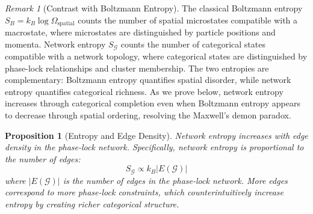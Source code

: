 \documentclass[12pt,a4paper]{article}
\newtheorem{proposition}[theorem]{Proposition}
\theoremstyle{definition}
\theoremstyle{remark}
\newtheorem{remark}[theorem]{Remark}
\newcommand{\phaselockgraph}{\mathcal{G}}
\begin{document}
\begin{remark}[Contrast with Boltzmann Entropy]
\label{rem:contrast_boltzmann}
The classical Boltzmann entropy $S_B = k_B \log \Omega_{\text{spatial}}$ counts the number of spatial microstates compatible with a macrostate, where microstates are distinguished by particle positions and momenta. Network entropy $S_{\phaselockgraph}$ counts the number of categorical states compatible with a network topology, where categorical states are distinguished by phase-lock relationships and cluster membership. The two entropies are complementary: Boltzmann entropy quantifies spatial disorder, while network entropy quantifies categorical richness. As we prove below, network entropy increases through categorical completion even when Boltzmann entropy appears to decrease through spatial ordering, resolving the Maxwell's demon paradox.
\end{remark}

\begin{proposition}[Entropy and Edge Density]
\label{prop:entropy_edge_density}
Network entropy increases with edge density in the phase-lock network. Specifically, network entropy is proportional to the number of edges:
\begin{equation}
S_{\phaselockgraph} \propto k_B |E(\phaselockgraph)|
\label{eq:entropy_edges}
\end{equation}
where $|E(\phaselockgraph)|$ is the number of edges in the phase-lock network. More edges correspond to more phase-lock constraints, which counterintuitively increase entropy by creating richer categorical structure.
\end{proposition}
\end{document}
